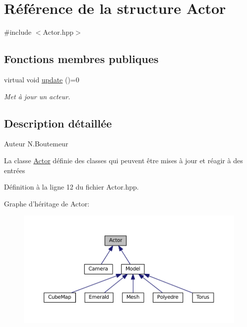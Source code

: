 \hypertarget{structActor}{\section{Référence de la structure Actor}
\label{structActor}
}


{\ttfamily \#include $<$Actor.\+hpp$>$}

\subsection*{Fonctions membres publiques}
\begin{DoxyCompactItemize}
\item 
virtual void \hyperlink{structActor_a4363e3b26c7903de41423a2fb1fc5f6e}{update} ()=0
\begin{DoxyCompactList}\small\item\em Met à jour un acteur. \end{DoxyCompactList}\end{DoxyCompactItemize}


\subsection{Description détaillée}
\begin{DoxyAuthor}{Auteur}
N.\+Boutemeur
\end{DoxyAuthor}
La classe \hyperlink{structActor}{Actor} définie des classes qui peuvent être mises à jour et réagir à des entrées 

Définition à la ligne 12 du fichier Actor.\+hpp.



Graphe d'héritage de Actor\+:
\nopagebreak
\begin{figure}[H]
\begin{center}
\leavevmode
\includegraphics[width=350pt]{structActor__inherit__graph}
\end{center}
\end{figure}


